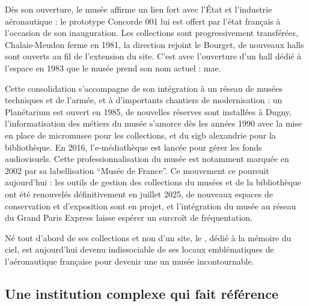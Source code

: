 Dès son ouverture, le musée affirme un lien fort avec l’État et l’industrie aéronautique : le prototype Concorde 001 lui est offert par l'état français à l'occasion de son inauguration. Les collections sont progressivement transférées, Chalais-Meudon ferme en 1981, la direction rejoint le Bourget, de nouveaux halls sont ouverts au fil de l’extension du site. C'est avec l'ouverture d'un hall dédié à l'espace en 1983 que le musée prend son nom actuel : \acf{mae}.

Cette consolidation s’accompagne de son intégration à un réseau de musées techniques et de l'armée, et à d'importants chantiers de modernisation : un Planétarium est ouvert en 1985, de nouvelles réserves sont installées à Dugny, l'informatisation des métiers du musée s'amorce dès les années 1990 avec la mise en place de \gls{micromusee} pour les collections, et du \ac{sigb} \gls{alexandrie} pour la bibliothèque. En 2016, l’e-médiathèque est lancée pour gérer les fonds audiovisuels. Cette professionnalisation du musée est notamment marquée en 2002 par sa labellisation \enquote{Musée de France}. Ce mouvement ce poursuit aujourd’hui : les outils de gestion des collections du musées et de la bibliothèque ont été renouvelés définitivement en juillet 2025, de nouveaux espaces de conservation et d’exposition sont en projet, et l'intégration du musée au réseau du Grand Paris Express laisse espérer un surcroît de fréquentation.

Né tout d'abord de ses collections et non d'un site, le \mae, dédié à la mémoire du ciel, est aujourd'hui devenu indissociable de ses locaux emblématiques de l'aéronautique française pour devenir une un musée incontournable.

\subsection{Une institution complexe qui fait référence}

